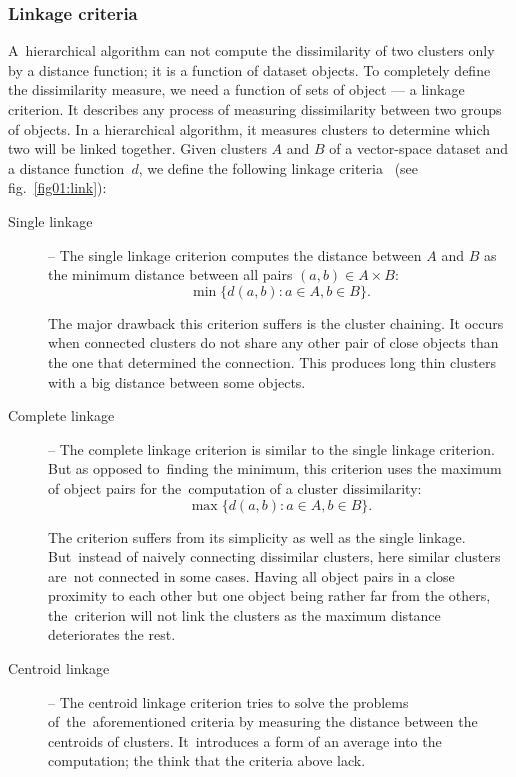 \subsubsection{Linkage criteria}

A~hierarchical algorithm can not compute the dissimilarity of two clusters only by a distance function; it is a function of dataset objects. To completely define the dissimilarity measure, we need a function of sets of object --- a linkage criterion. It describes any process of measuring dissimilarity between two groups of objects. In a hierarchical algorithm, it measures clusters to determine which two will be linked together. Given clusters $A$ and $B$ of a vector-space dataset and a distance function~$d$, we define the following linkage criteria~\cite{yim2015hierarchical} (see fig.~\ref{fig01:link}):

\begin{description}
	\item[Single linkage] -- The single linkage criterion computes the distance between $A$ and $B$ as the minimum distance between all pairs $(a,b) \in A\times B$:
	$$\min\{d(a,b) : a \in A, b \in B\}.$$
	
	The major drawback this criterion suffers is the cluster chaining. It occurs when connected clusters do not share any other pair of close objects than the one that determined the connection. This produces long thin clusters with a big distance between some objects.
	
	\item[Complete linkage] -- The complete linkage criterion is similar to the single linkage criterion. But as opposed to~finding the minimum, this criterion uses the maximum of object pairs for the~computation of a cluster dissimilarity:
	$$\max\{d(a,b) : a \in A, b \in B\}.$$
	
	The criterion suffers from its simplicity as well as the single linkage. But~instead of naively connecting dissimilar clusters, here similar clusters are~not connected in some cases. Having all object pairs in a close proximity to each other but one object being rather far from the others, the~criterion will not link the clusters as the maximum distance deteriorates the rest.
	
	\item[Centroid linkage] -- The centroid linkage criterion tries to solve the problems of~the~aforementioned criteria by measuring the distance between the centroids of clusters. It~introduces a form of an average into the computation; the think that the criteria above lack.
\end{description}

